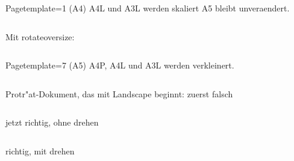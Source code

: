 \documentclass[a4paper,\myClassOptions]{article}
\begin{document}
\Large

Pagetemplate=1 (A4) \textrightarrow A4L und A3L werden skaliert
   A5 bleibt unveraendert.
\begin{verbatim}

\end{verbatim}


Mit rotateoversize:
\begin{verbatim}

\end{verbatim}


Pagetemplate=7 (A5) \textrightarrow A4P, A4L und A3L werden verkleinert.
\begin{verbatim}

\end{verbatim}


Protr"at-Dokument, das mit Landscape beginnt: zuerst falsch
\begin{verbatim}

\end{verbatim}


jetzt richtig, ohne drehen
\begin{verbatim}

\end{verbatim}


richtig, mit drehen
\begin{verbatim}

\end{verbatim}

\end{document}
